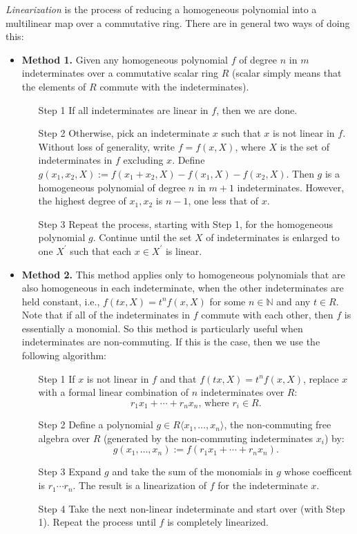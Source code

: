 \documentclass[12pt]{article}
\begin{document}
\emph{Linearization} is the process of reducing a homogeneous polynomial into a multilinear map over a commutative ring.  There are in general two ways of doing this:

\begin{itemize}
\item \textbf{Method 1.} Given any homogeneous polynomial $f$ of degree $n$ in $m$ indeterminates over a commutative 
scalar ring $R$ (scalar simply means that the elements of $R$ commute with the indeterminates). 
\begin{enumerate}
\item[Step 1]  If all indeterminates are linear in $f$, then we are done.  
\item[Step 2]  Otherwise, pick an indeterminate $x$ such that $x$ is not linear in $f$.  Without loss of generality, 
write $f=f(x,X)$, where $X$ is the set of indeterminates in $f$ excluding $x$.  Define 
$g(x_1,x_2,X):=f(x_1+x_2,X)-f(x_1,X)-f(x_2,X)$.  Then $g$ is a homogeneous polynomial of degree $n$ in $m+1$ 
indeterminates.  However, the highest degree of $x_1,x_2$ is $n-1$, one less that of $x$.
\item[Step 3]  Repeat the process, starting with Step 1, for the homogeneous polynomial $g$.  Continue until the set $X$ 
of indeterminates is enlarged to one $X^{'}$ such that each $x\in X^{'}$ is linear.
\end{enumerate}
\item \textbf{Method 2.} This method applies only to homogeneous polynomials that are also homogeneous in each 
indeterminate, when the other indeterminates are held constant, i.e., $f(tx,X)=t^nf(x,X)$ for some $n\in\mathbb{N}$ and 
any $t\in R$.  Note that if all of the indeterminates in $f$ commute with each other, then $f$ is essentially a 
monomial.  So this method is particularly useful when indeterminates are non-commuting.  If this is the case, then we 
use the following algorithm:
\begin{enumerate}
\item[Step 1]  If $x$ is not linear in $f$ and that $f(tx,X)=t^nf(x,X)$, replace $x$ with a formal linear combination of 
$n$ indeterminates over $R$: $$r_1x_1+\cdots+r_nx_n\mbox{,   where }r_i\in R.$$  
\item[Step 2]  Define a polynomial $g\in R\langle x_1,\ldots,x_n \rangle$, the non-commuting free algebra over $R$ 
(generated by the non-commuting indeterminates $x_i$) by: $$g(x_1,\ldots,x_n):=f(r_1x_1+\cdots+r_nx_n).$$  
\item[Step 3]  Expand $g$ and take the sum of the monomials in $g$ whose coefficent is $r_1\cdots r_n$.  The result is a 
linearization of $f$ for the indeterminate $x$.
\item[Step 4]  Take the next non-linear indeterminate and start over (with Step 1).  Repeat the process until $f$ is 
completely linearized.
\end{enumerate}
\end{itemize}
\end{document}
